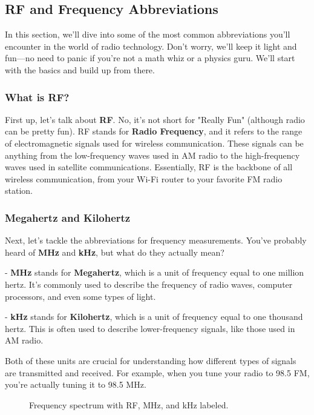 \subsection{RF and Frequency Abbreviations}
\label{subsec:rf-abbrev}

In this section, we'll dive into some of the most common abbreviations you'll encounter in the world of radio technology. Don't worry, we'll keep it light and fun—no need to panic if you're not a math whiz or a physics guru. We'll start with the basics and build up from there.

\subsubsection*{What is RF?}

First up, let's talk about \textbf{RF}. No, it's not short for "Really Fun" (although radio can be pretty fun). RF stands for \textbf{Radio Frequency}, and it refers to the range of electromagnetic signals used for wireless communication. These signals can be anything from the low-frequency waves used in AM radio to the high-frequency waves used in satellite communications. Essentially, RF is the backbone of all wireless communication, from your Wi-Fi router to your favorite FM radio station.

\subsubsection*{Megahertz and Kilohertz}

Next, let's tackle the abbreviations for frequency measurements. You've probably heard of \textbf{MHz} and \textbf{kHz}, but what do they actually mean? 

- \textbf{MHz} stands for \textbf{Megahertz}, which is a unit of frequency equal to one million hertz. It's commonly used to describe the frequency of radio waves, computer processors, and even some types of light.
  
- \textbf{kHz} stands for \textbf{Kilohertz}, which is a unit of frequency equal to one thousand hertz. This is often used to describe lower-frequency signals, like those used in AM radio.

Both of these units are crucial for understanding how different types of signals are transmitted and received. For example, when you tune your radio to 98.5 FM, you're actually tuning it to 98.5 MHz.

\begin{figure}[h]
    \centering
    \caption{Frequency spectrum with RF, MHz, and kHz labeled.}
    \label{fig:frequency-spectrum}
\end{figure}

